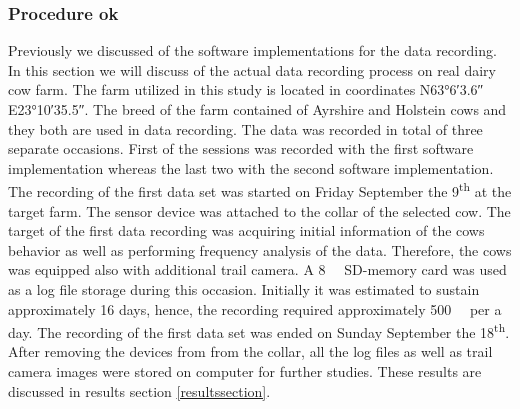 \documentclass[english,12pt,a4paper,pdftex,elec,utf8]{aaltothesis}
\begin{document}
\subsubsection{Procedure ok} \label{proceduresection}

Previously we discussed of the software implementations for the data recording. In this section we will discuss of the actual data recording process on real dairy cow farm. The farm utilized in this study is located in coordinates N\ang{63;6;3.6} E\ang{23;10;35.5}. The breed of the farm contained of Ayrshire and Holstein cows and they both are used in data recording. The data was recorded in total of three separate occasions. First of the sessions was recorded with the first software implementation whereas the last two with the second software implementation. The recording of the first data set was started on Friday September the 9\textsuperscript{th} at the target farm. The sensor device was attached to the collar of the selected cow. The target of the first data recording was acquiring initial information of the cows behavior as well as performing frequency analysis of the data. Therefore, the cows was equipped also with additional trail camera. A  \SI{8}{\giga \byte} SD-memory card was used as a log file storage during this occasion. Initially it was estimated to sustain approximately 16 days, hence, the recording required approximately \SI{500}{\mega \byte} per a day. The recording of the first data set was ended on Sunday September the 18\textsuperscript{th}. After removing the devices from from the collar, all the log files as well as trail camera images were stored on computer for further studies. These results are discussed in results section \ref{resultssection}.
\end{document}
